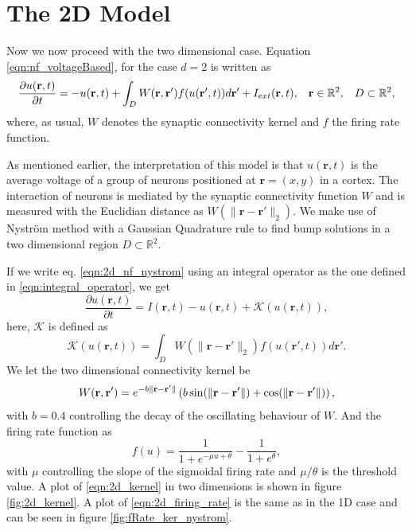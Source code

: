 \documentclass{uonmathreport}
\begin{document}
\section{The 2D Model}\label{sec:2d_model}
Now we now proceed with the two dimensional case. Equation \ref{eqn:nf_voltageBased}, for the case $d=2$ is written as
\begin{equation} \label{eqn:2d_nf_nystrom}
	\frac{\partial u(\mathbf{r},t)}{\partial t} = - u(\mathbf{r},t) +
	\int_{D} W(\mathbf{r},\mathbf{r'})f(u(\mathbf{r'},t))
	d\mathbf{r'} + I_{ext}(\mathbf{r},t), \hspace{3mm} \mathbf{r} \in \mathbb{R}^2, \hspace{3mm} D \subset \mathbb{R}^2,
\end{equation}
where, as usual, $W$ denotes the synaptic connectivity kernel and $f$ the firing rate function.

As mentioned earlier, the interpretation of this model is that $u(\mathbf{r},t)$ is the average voltage of a group of neurons positioned at $\mathbf{r} = (x,y)$ in a cortex. The interaction of neurons is mediated by the synaptic connectivity function $W$ and is measured with the Euclidian distance as $W(\|\mathbf{r}-\mathbf{r'}\|_2)$. We make use of Nystr\"om method with a Gaussian Quadrature rule to find bump solutions in a two dimensional region $D \subset \mathbb{R}^2$.

If we write eq. \ref{eqn:2d_nf_nystrom} using an integral operator as the one defined in \ref{eqn:integral_operator}, we get
\begin{equation}\label{eqn:2d_nf_nystrom_integoperator}
\frac{\partial u(\mathbf{r},t)}{\partial t} = I(\mathbf{r},t)- u(\mathbf{r},t) +
\mathcal{K}(u(\mathbf{r},t)),
\end{equation}
here, $\mathcal{K}$ is defined as
\begin{equation}\label{eqn:2d_integoperator}
	\mathcal{K}(u(\mathbf{r},t)) = \int_{D} W(\|\mathbf{r}-\mathbf{r'}\|_2)f(u(\mathbf{r'},t))
	d\mathbf{r'}.
\end{equation}
We let the two dimensional connectivity kernel be
\begin{equation}\label{eqn:2d_kernel}
	W(\mathbf{r},\mathbf{r'}) = e^{-b\|\mathbf{r}-\mathbf{r'}\|}
	\left(b \space \sin(\|\mathbf{r}-\mathbf{r'}\|) + \cos(\|\mathbf{r}-\mathbf{r'}\|)\right),
\end{equation}
with $b=0.4$ controlling the decay of the oscillating behaviour of $W$. And the firing rate function as 
\begin{equation}\label{eqn:2d_firing_rate}
f(u) = \frac{1}{1+e^{-\mu u + \theta}} -\frac{1}{1+e^\theta},
\end{equation}
with $\mu$ controlling the slope of the sigmoidal firing rate and $\mu/\theta$ is the threshold value. A plot of \ref{eqn:2d_kernel} in two dimensions is shown in figure \ref{fig:2d_kernel}. A plot of \ref{eqn:2d_firing_rate} is the same as in the 1D case and can be seen in figure \ref{fig:fRate_ker_nystrom}.
\end{document}

